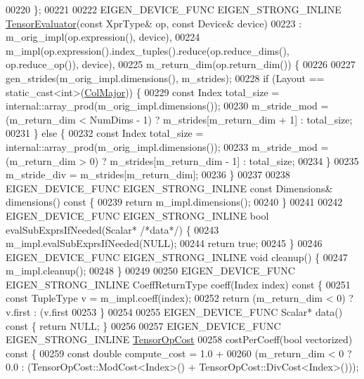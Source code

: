 \begin{DoxyCode}
00220   \};
00221 
00222   EIGEN\_DEVICE\_FUNC EIGEN\_STRONG\_INLINE \hyperlink{struct_eigen_1_1_tensor_evaluator}{TensorEvaluator}(\textcolor{keyword}{const} XprType& op, \textcolor{keyword}{const} Device& 
      device)
00223       : m\_orig\_impl(op.expression(), device),
00224         m\_impl(op.expression().index\_tuples().reduce(op.reduce\_dims(), op.reduce\_op()), device),
00225         m\_return\_dim(op.return\_dim()) \{
00226 
00227     gen\_strides(m\_orig\_impl.dimensions(), m\_strides);
00228     \textcolor{keywordflow}{if} (Layout == static\_cast<int>(\hyperlink{group__enums_ggaacded1a18ae58b0f554751f6cdf9eb13a0cbd4bdd0abcfc0224c5fcb5e4f6669a}{ColMajor})) \{
00229       \textcolor{keyword}{const} Index total\_size = internal::array\_prod(m\_orig\_impl.dimensions());
00230       m\_stride\_mod = (m\_return\_dim < NumDims - 1) ? m\_strides[m\_return\_dim + 1] : total\_size;
00231     \} \textcolor{keywordflow}{else} \{
00232       \textcolor{keyword}{const} Index total\_size = internal::array\_prod(m\_orig\_impl.dimensions());
00233       m\_stride\_mod = (m\_return\_dim > 0) ? m\_strides[m\_return\_dim - 1] : total\_size;
00234     \}
00235     m\_stride\_div = m\_strides[m\_return\_dim];
00236   \}
00237 
00238   EIGEN\_DEVICE\_FUNC EIGEN\_STRONG\_INLINE \textcolor{keyword}{const} Dimensions& dimensions()\textcolor{keyword}{ const }\{
00239     \textcolor{keywordflow}{return} m\_impl.dimensions();
00240   \}
00241 
00242   EIGEN\_DEVICE\_FUNC EIGEN\_STRONG\_INLINE \textcolor{keywordtype}{bool} evalSubExprsIfNeeded(Scalar* \textcolor{comment}{/*data*/}) \{
00243     m\_impl.evalSubExprsIfNeeded(NULL);
00244     \textcolor{keywordflow}{return} \textcolor{keyword}{true};
00245   \}
00246   EIGEN\_DEVICE\_FUNC EIGEN\_STRONG\_INLINE \textcolor{keywordtype}{void} cleanup() \{
00247     m\_impl.cleanup();
00248   \}
00249 
00250   EIGEN\_DEVICE\_FUNC EIGEN\_STRONG\_INLINE CoeffReturnType coeff(Index index)\textcolor{keyword}{ const }\{
00251     \textcolor{keyword}{const} TupleType v = m\_impl.coeff(index);
00252     \textcolor{keywordflow}{return} (m\_return\_dim < 0) ? v.first : (v.first %
00253   \}
00254 
00255   EIGEN\_DEVICE\_FUNC Scalar* data()\textcolor{keyword}{ const }\{ \textcolor{keywordflow}{return} NULL; \}
00256 
00257   EIGEN\_DEVICE\_FUNC EIGEN\_STRONG\_INLINE \hyperlink{class_eigen_1_1_tensor_op_cost}{TensorOpCost}
00258   costPerCoeff(\textcolor{keywordtype}{bool} vectorized)\textcolor{keyword}{ const }\{
00259     \textcolor{keyword}{const} \textcolor{keywordtype}{double} compute\_cost = 1.0 +
00260         (m\_return\_dim < 0 ? 0.0 : (TensorOpCost::ModCost<Index>() + TensorOpCost::DivCost<Index>()));

\end{DoxyCode}
